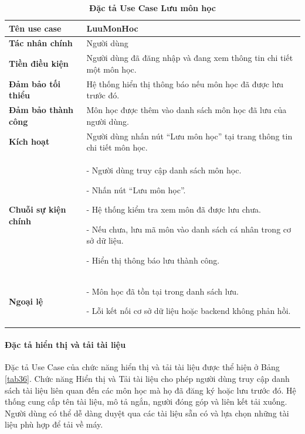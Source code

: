 \documentclass{article}
\begin{document}
	\begin{table}[H]
		\centering
		\caption [Đặc tả Use Case Lưu môn học]{\bfseries \fontsize{12pt}{0pt}\selectfont Đặc tả Use Case Lưu môn học}
		\label{tab35}
		\begin{tabular}{|p{4cm}|p{10.5cm}|}
			\hline
			\textbf{Tên use case} & LuuMonHoc \\
			\hline
			\textbf{Tác nhân chính} & Người dùng \\
			\hline
			\textbf{Tiền điều kiện} & Người dùng đã đăng nhập và đang xem thông tin chi tiết một môn học. \\
			\hline
			\textbf{Đảm bảo tối thiểu} & Hệ thống hiển thị thông báo nếu môn học đã được lưu trước đó. \\
			\hline
			\textbf{Đảm bảo thành công} & Môn học được thêm vào danh sách môn học đã lưu của người dùng. \\
			\hline
			\textbf{Kích hoạt} & Người dùng nhấn nút “Lưu môn học” tại trang thông tin chi tiết môn học. \\
			\hline
			\textbf{Chuỗi sự kiện chính} &
			- Người dùng truy cập danh sách môn học.
			
			- Nhấn nút “Lưu môn học”.
			
			- Hệ thống kiểm tra xem môn đã được lưu chưa.
			
			- Nếu chưa, lưu mã môn vào danh sách cá nhân trong cơ sở dữ liệu.
			
			- Hiển thị thông báo lưu thành công.
			\\
			\hline
			\textbf{Ngoại lệ} &
			- Môn học đã tồn tại trong danh sách lưu.
			
			- Lỗi kết nối cơ sở dữ liệu hoặc backend không phản hồi.
			\\
			\hline
		\end{tabular}
	\end{table}
	
	\paragraph{Đặc tả hiển thị và tải tài liệu} \mbox{}
	
	Đặc tả Use Case của chức năng hiển thị và tải tài liệu được thể hiện ở Bảng \ref{tab36}. Chức năng Hiển thị và Tải tài liệu cho phép người dùng truy cập danh sách tài liệu liên quan đến các môn học mà họ đã đăng ký hoặc lưu trước đó. Hệ thống cung cấp tên tài liệu, mô tả ngắn, người đóng góp và liên kết tải xuống. Người dùng có thể dễ dàng duyệt qua các tài liệu sẵn có và lựa chọn những tài liệu phù hợp để tải về máy.
	
\end{document}
